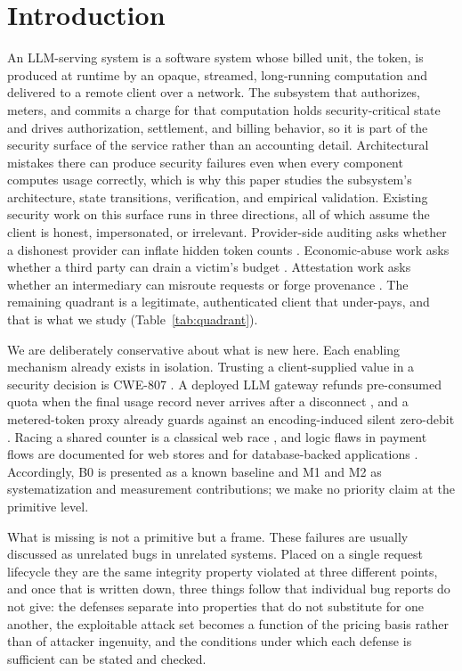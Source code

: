 \documentclass[preprint,3p,authoryear,12pt]{elsarticle}
\begin{document}
\section{Introduction}
An LLM-serving system is a software system whose billed unit, the token, is produced at
runtime by an opaque, streamed, long-running computation and delivered to a remote client
over a network. The subsystem that authorizes, meters, and commits a charge for that
computation holds security-critical state and drives authorization, settlement, and
billing behavior, so it is part of the security surface of the service rather than an
accounting detail. Architectural mistakes there can produce security failures even when
every component computes usage correctly, which is why this paper studies the
subsystem's architecture, state transitions, verification, and empirical validation.
Existing security
work on this surface runs in three directions, all of which assume the client is honest,
impersonated, or irrelevant. Provider-side auditing asks whether a dishonest provider can
inflate hidden token counts \citep{coin,invisible,tokeninflation}. Economic-abuse work asks
whether a third party can drain a victim's budget \citep{dow,dowreview,owasp,llmjacking}.
Attestation work asks whether an intermediary can misroute requests or forge provenance
\citep{aex,gwprov}. The remaining quadrant is a legitimate, authenticated client that
under-pays, and that is what we study (Table~\ref{tab:quadrant}).

We are deliberately conservative about what is new here. Each enabling mechanism already
exists in isolation. Trusting a client-supplied value in a security decision is CWE-807
\citep{cwe807}. A deployed LLM gateway refunds pre-consumed quota when the final usage
record never arrives after a disconnect \citep{newapi5235}, and a metered-token proxy
already guards against an encoding-induced silent zero-debit \citep{aperture247}. Racing a
shared counter is a classical web race \citep{kettle}, and logic flaws in payment flows are
documented for web stores \citep{cashier} and for database-backed applications
\citep{acidrain}. Accordingly, B0 is presented as a
known baseline and M1 and M2 as systematization and measurement contributions; we make no
priority claim at the primitive level.

What is missing is not a primitive but a frame. These failures are usually discussed as
unrelated bugs in unrelated systems. Placed on a single request lifecycle they are the
same integrity property violated at three different points, and once that is written
down, three things follow that individual bug reports do not give: the defenses separate
into properties that do not substitute for one another, the exploitable attack set becomes
a function of the pricing basis rather than of attacker ingenuity, and the conditions
under which each defense is sufficient can be stated and checked.
\end{document}
